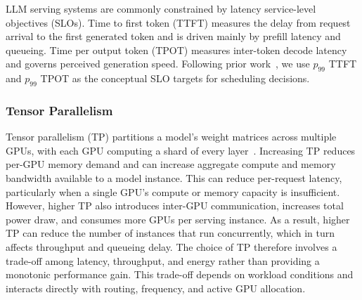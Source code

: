 LLM serving systems are commonly constrained by latency service-level objectives (SLOs). 
Time to first token (TTFT) measures the delay from request arrival to the first generated token and is driven mainly by prefill latency and queueing. 
Time per output token (TPOT) measures inter-token decode latency and governs perceived generation speed. 
Following prior work~\cite{stojkovic2024dynamollm}, we use $p_{99}$ TTFT and $p_{99}$ TPOT as the conceptual SLO targets for scheduling decisions.


\subsubsection*{\normalfont\textbf{Tensor Parallelism}}
\label{sec:bg_tp}

Tensor parallelism (TP) partitions a model's weight matrices across multiple GPUs, with each GPU computing a shard of every layer~\cite{kwon2023vllm}.
Increasing TP reduces per-GPU memory demand and can increase aggregate compute and memory bandwidth available to a model instance.
This can reduce per-request latency, particularly when a single GPU's compute or memory capacity is insufficient.
However, higher TP also introduces inter-GPU communication, increases total power draw, and consumes more GPUs per serving instance.
As a result, higher TP can reduce the number of instances that run concurrently, which in turn affects throughput and queueing delay.
The choice of TP therefore involves a trade-off among latency, throughput, and energy rather than providing a monotonic performance gain.
This trade-off depends on workload conditions and interacts directly with routing, frequency, and active GPU allocation.

